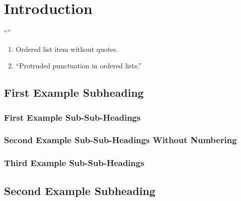 \section{Introduction}

\enquote{\lipsum[1-1]}

\begin{enumerate}
    \item Ordered list item without quotes.
    \item \enquote{Protruded punctuation in ordered lists.}
\end{enumerate}

\subsection{First Example Subheading}

\lipsum[1-4]

\blockquote{%
    \lipsum[1]
}

\subsubsection{First Example Sub-Sub-Headings}

\lipsum[1-1]

\subsubsection*{Second Example Sub-Sub-Headings Without Numbering}

\lipsum[1-1]

\subsubsection{Third Example Sub-Sub-Headings}

\lipsum[1-1]

\subsection{Second Example Subheading}

\lipsum[1-1]